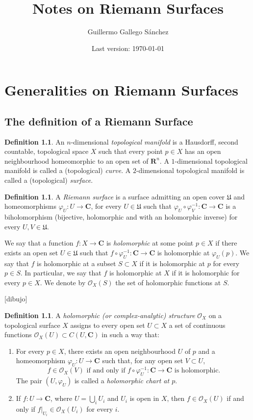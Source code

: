 \documentclass[12pt,a4paper]{book}
\title{Notes on Riemann Surfaces}
\author{Guillermo Gallego Sánchez}
\date{Last version: \today}
\theoremstyle{definition} \newtheorem{defn}[thm]{Definition}
\theoremstyle{definition} \newtheorem{ejemplo}[thm]{Example}
\theoremstyle{definition} \newtheorem{ejercicio}[thm]{Exercise}
\theoremstyle{remark} \newtheorem*{obs}{Remark}
\def\CC{\mathbf{C}}
\def\RR{\mathbf{R}}
\def\OO{\mathscr{O}}
\begin{document}
\maketitle
\tableofcontents

\chapter{Generalities on Riemann Surfaces}

\section{The definition of a Riemann Surface}
\begin{defn}
  An $n$-dimensional \emph{topological manifold} is a Hausdorff, second countable, topological space $X$ such that every point $p\in X$ has an open neighbourhood homeomorphic to an open set of $\RR^n$.
  A $1$-dimensional topological manifold is called a (topological) \emph{curve}. A $2$-dimensional topological manifold is called a (topological) \emph{surface}.
\end{defn}
\begin{defn}
  A \emph{Riemann surface} is a surface admitting an open cover $\mathfrak{U}$ and homeomorphisms $\varphi_U:U\rightarrow \CC$, for every $U\in \mathfrak{U}$ such that $\varphi_U\circ \varphi_V^{-1}:\CC \rightarrow \CC$ is a biholomorphism (bijective, holomorphic and with an holomorphic inverse) for every $U,V \in \mathfrak{U}$.

 We say that a function $f:X\rightarrow \CC$ is \emph{holomorphic} at some point $p\in X$ if there exists an open set $U\in \mathfrak{U}$ such that $f\circ \varphi_U^{-1}: \CC \rightarrow \CC$ is holomorphic at $\varphi_U(p)$. We say that $f$ is holomorphic at a subset $S\subset X$ if it is holomorphic at $p$ for every $p\in S$. In particular, we say that $f$ is holomorphic at $X$ if it is holomorphic for every $p\in X$. We denote by $\OO_X(S)$ the set of holomorphic functions at $S$.
\end{defn}

[dibujo]

\begin{defn}
  A \emph{holomorphic (or complex-analytic) structure} $\OO_X$ on a topological surface $X$ assigns to every open set $U\subset X$ a set of continuous functions $\OO_X(U)\subset C(U,\CC)$ in such a way that:
  \begin{enumerate}
    \item For every $p\in X$, there exists an open neighbourhood $U$ of $p$ and a homeomorphism $\varphi_U:U\rightarrow \CC$ such that, for any open set $V\subset U$, 
      \begin{equation*}
	f\in \OO_X(V) \text{ if and only if } f\circ\varphi_U^{-1}:\CC \rightarrow \CC \text{ is holomorphic.} 
      \end{equation*}
      The pair $(U,\varphi_U)$ is called a \emph{holomorphic chart at $p$}.
    \item If $f:U\rightarrow \CC$, where $U=\bigcup_i U_i$ and $U_i$ is open in $X$, then $f\in \OO_X(U)$ if and only if $f|_{U_i}\in \OO_X(U_i)$ for every $i$.
  \end{enumerate}
\end{defn}
\end{document}
